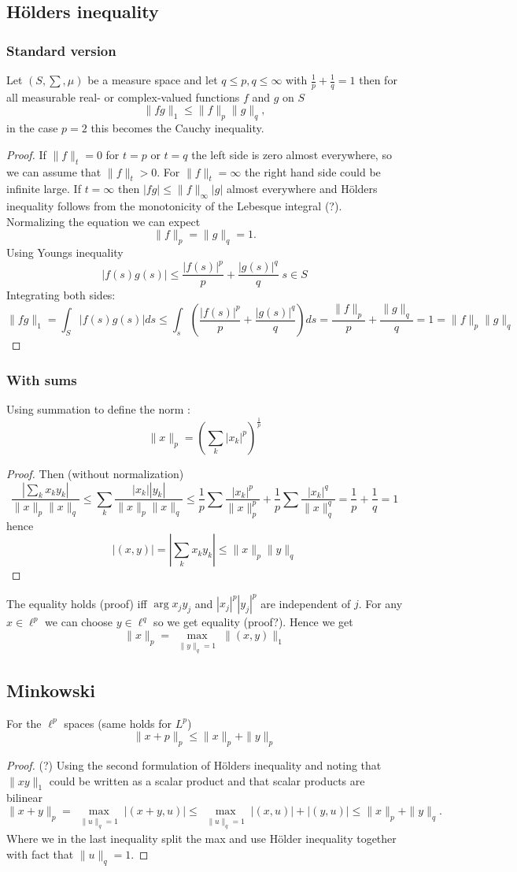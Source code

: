 \documentclass[titlepage]{article}
\begin{document}
\subsection{Hölders inequality}
\subsubsection{Standard version}
Let $(S,\sum, \mu)$ be a measure space and let $q \leq p, q \leq \infty$ with $\frac{1}{p}+ \frac{1}{q} = 1$ then for all measurable real- or complex-valued functions $f$ and $g$ on $S$
$$\|fg\|_1 \leq \|f\|_p \|g\|_q,$$
in the case $p = 2$ this becomes the Cauchy inequality.
\begin{proof}
If $\|f\|_{t} = 0$ for $t = p$ or $t = q$ the left side is zero almost everywhere, so we can assume that $\|f\|_t > 0$. For $\|f\|_{t}= \infty$ the right hand side could be infinite large. 
If $t = \infty$ then $|fg|\leq\|f\|_\infty|g|$ almost everywhere and Hölders inequality follows from the monotonicity of the Lebesque integral (?). Normalizing the equation we can expect
$$\|f\|_p = \|g\|_q = 1.$$
Using Youngs inequality
$$|f(s) g(s)| \leq \frac{|f(s)|^p}{p} + \frac{|g(s)| ^q}{q} \; s\in S$$
Integrating both sides:
$$\|fg\|_1 = \int_S |f(s)g(s)| ds \leq \int_s \left(\frac{|f(s)|^p}{p} + \frac{|g(s)| ^q}{q} \right) ds = \frac{\|f\|_p}{p} + \frac{\|g\|_q}{q} = 1 = \|f\|_p \|g\|_q $$
\end{proof}
\subsubsection{With sums}
Using summation to define the norm :
$$\|x\|_p = \left(\sum_k|x_k|^p\right)^{\frac{1}{p}}$$
\begin{proof}


Then (without normalization)
$$\frac{|\sum_kx_ky_k|}{\|x\|_p\|x\|_q} \leq  \sum_k\frac{|x_k||y_k|}{\|x\|_p\|x\|_q} \leq  \frac{1}{p}\sum \frac{|x_k|^p}{\|x\|_p^p}+ \frac{1}{p}\sum \frac{|x_k|^q}{\|x\|_q^q} = \frac{1}{p} + \frac{1}{q} = 1$$
hence
$$|(x,y)|= |\sum_kx_ky_k| \leq {\|x\|_p\|y\|_q}$$
\end{proof}
The equality holds (proof) iff $\arg x_jy_j$  and $|x_j|^p|y_j|^p$ are independent of $j$. For any $x\in \ell^p$ we can choose $y\in \ell^q$ so we get equality (proof?). Hence we get 
$$ \|x\|_p = \max\limits_{\substack{\|y\|_q = 1}}\|(x,y)\|_1$$

\subsection{Minkowski}
For the $\ell^p$ spaces (same holds for $L^p$)
$$\|x+p\|_p \leq\|x\|_p+ \|y\|_p$$
\begin{proof}
(?)
Using the second formulation of Hölders inequality and noting that $\|xy\|_1$ could be written as a scalar product and that scalar products are bilinear
$$\|x+y\|_p = \max\limits_{\substack{\|u\|_q = 1}}|(x+y,u)| \leq
\max\limits_{\substack{\|u\|_q = 1}}|(x,u)|+ |(y,u)| \leq \|x\|_p +\|y\|_q.$$
Where we in the last inequality split the max and use Hölder inequality together with fact that $\|u\|_q = 1.$
\end{proof}
\end{document}
